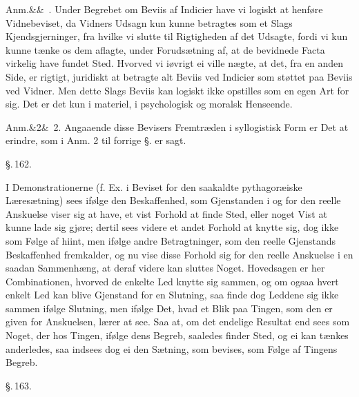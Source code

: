\documentclass[12pt]{book}
\def\sperr#1{#1}%
\def\textit#1{#1}%
\newcommand{\sperr}[1]{\textls[180]{#1}}
\newcommand{\parag}[1]{%
  \par\vspace{0.9\baselineskip}%
  {\centering\textit{\S.\,#1.}\par}%
  \vspace{0.35\baselineskip}%
  \noindent\hspace{\parindent}\ignorespaces
}
\newcommand{\anm}[1]{%
  \par\vspace{0.5\baselineskip}%
  \noindent\hspace{\parindent}\sperr{Anm.}\ifx&#1&\else~\textit{#1}.\fi
  \enspace\ignorespaces
}
\newcommand{\opage}[1]{\marginnote{\footnotesize\textit{[#1]}}}
\begin{document}
\anm{} Under Begrebet om Beviis af Indicier have vi logiskt at henføre
Vidnebeviset, da Vidners Udsagn kun kunne betragtes som et Slags
Kjendsgjerninger, fra hvilke vi slutte til Rigtigheden af det Udsagte, fordi vi
kun kunne tænke os dem aflagte, under Forudsætning af, at de bevidnede Facta
virkelig have fundet Sted. Hvorved vi iøvrigt ei ville nægte, at det, fra en
anden Side, er rigtigt, juridiskt
\opage{356} at betragte alt Beviis ved Indicier som støttet paa Beviis ved Vidner. Men dette
Slags Beviis kan logiskt ikke opstilles som en egen Art for sig. Det er det kun
i materiel, i psychologisk og moralsk Henseende.

\anm{2} Angaaende disse Bevisers Fremtræden i syllogistisk Form er Det at
erindre, som i Anm. 2 til forrige §. er sagt.

\parag{162}

I Demonstrationerne (f. Ex. i Beviset for den saakaldte pythagoræiske
Læresætning) sees ifølge den Beskaffenhed, som Gjenstanden i og for den reelle
Anskuelse viser sig at have, et vist Forhold at finde Sted, eller noget Vist at
kunne lade sig gjøre; dertil sees videre et andet Forhold at knytte sig, dog
ikke som Følge af hiint, men ifølge andre Betragtninger, som den reelle
Gjenstands Beskaffenhed fremkalder, og nu vise disse Forhold sig for den reelle
Anskuelse i en saadan Sammenhæng, at deraf videre kan sluttes Noget. Hovedsagen
er her Combinationen, hvorved de enkelte Led knytte sig sammen, og om ogsaa
hvert enkelt Led kan blive Gjenstand for en Slutning, saa finde dog Leddene sig
ikke sammen ifølge Slutning, men ifølge Det, hvad et Blik paa Tingen, som den er
given for Anskuelsen, lærer at see. Saa at, om det endelige Resultat end sees
som Noget, der hos Tingen, ifølge dens Begreb, saaledes finder Sted, og ei kan
tænkes anderledes, saa indsees dog ei den
\opage{357} Sætning, som bevises, som Følge af Tingens Begreb.

\parag{163}
\end{document}
